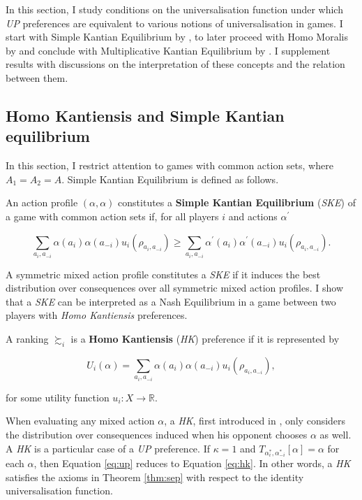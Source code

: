 In this section, I study conditions on the universalisation function under which \textit{UP} preferences are equivalent to various notions of universalisation in games. I start with Simple Kantian Equilibrium by \cite{roemer2019we}, to later proceed with Homo Moralis by \cite{algerHomoMoralisPreference2013} and conclude with Multiplicative Kantian Equilibrium by \cite{roemer2019we}. I supplement results with discussions on the interpretation of these concepts and the relation between them.

\subsection{Homo Kantiensis and Simple Kantian equilibrium}

In this section, I restrict attention to games with common action sets, where \(A_1= A_2 =A\). Simple Kantian Equilibrium is defined as follows.

\begin{definition}\label{definition:ske}
	An action profile \( ( \alpha, \alpha ) \) constitutes a \textbf{Simple Kantian Equilibrium} (\textit{SKE}) of a game with common action sets if, for all players \(i\) and actions \(\alpha^{\prime}\)

	\[
		\sum_{a_i, a_{-i}} \alpha (a_i) \alpha (a_{-i}) u_i(\rho_{a_i, a_{-i}}) \geq  \sum_{a_i, a_{-i}} \alpha^{\prime} (a_i) \alpha^{\prime} (a_{-i}) u_i(\rho_{a_i, a_{-i}}) .
	\]
\end{definition}

A symmetric mixed action profile constitutes a \textit{SKE} if it induces the best distribution over consequences over all symmetric mixed action profiles. I show that a \textit{SKE} can be interpreted as a Nash Equilibrium in a game between two players with \textit{Homo Kantiensis} preferences.

\begin{definition}\label{def:hk}
	A ranking \( \succsim_i \) is a \textbf{Homo Kantiensis} (\textit{HK}) preference if it is represented by

	\begin{equation}\label{eq:hk}
		U_i ( \alpha ) = \sum_{a_i, a_{-i}} \alpha (a_i) \alpha (a_{-i}) u_i(\rho_{a_i, a_{-i}}) ,
	\end{equation}

	for some utility function \(u_i \colon X \rightarrow \mathbb{R}\).
\end{definition}

When evaluating any mixed action \( \alpha \), a \textit{HK}, first introduced in \cite{laffontMacroeconomicConstraintsEconomic1975}, only considers the distribution over consequences induced when his opponent chooses \( \alpha \) as well. A \textit{HK} is a particular case of a \textit{UP} preference. If \( \kappa = 1 \) and \( T_{\alpha^{*}_i, \alpha^{*}_{-i}} [ \alpha ] = \alpha \) for each \( \alpha\), then Equation \eqref{eq:up} reduces to Equation \eqref{eq:hk}. In other words, a \textit{HK} satisfies the axioms in Theorem \ref{thm:sep} with respect to the identity universalisation function.

